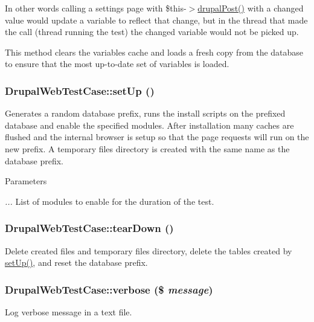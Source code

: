 In other words calling a settings page with \$this-\/$>$\hyperlink{class_drupal_web_test_case_aa773e6bf6ff8d0085dc60fb6d9ba888e}{drupalPost()} with a changed value would update a variable to reflect that change, but in the thread that made the call (thread running the test) the changed variable would not be picked up.

This method clears the variables cache and loads a fresh copy from the database to ensure that the most up-\/to-\/date set of variables is loaded. \hypertarget{class_drupal_web_test_case_a110ecf5deb57ee6a908617360c1f6ec4}{
\subsubsection[{setUp}]{\setlength{\rightskip}{0pt plus 5cm}DrupalWebTestCase::setUp ()}}
\label{class_drupal_web_test_case_a110ecf5deb57ee6a908617360c1f6ec4}
Generates a random database prefix, runs the install scripts on the prefixed database and enable the specified modules. After installation many caches are flushed and the internal browser is setup so that the page requests will run on the new prefix. A temporary files directory is created with the same name as the database prefix.


\begin{DoxyParams}{Parameters}
\item[{\em ...}]List of modules to enable for the duration of the test. \end{DoxyParams}
\hypertarget{class_drupal_web_test_case_a6c0dba3c89c4aab3fa2576857c6f2be1}{
\subsubsection[{tearDown}]{\setlength{\rightskip}{0pt plus 5cm}DrupalWebTestCase::tearDown ()}}
\label{class_drupal_web_test_case_a6c0dba3c89c4aab3fa2576857c6f2be1}
Delete created files and temporary files directory, delete the tables created by \hyperlink{class_drupal_web_test_case_a110ecf5deb57ee6a908617360c1f6ec4}{setUp()}, and reset the database prefix. \hypertarget{class_drupal_web_test_case_a46e4ad5abf681eff423f6b6de5d9f361}{
\subsubsection[{verbose}]{\setlength{\rightskip}{0pt plus 5cm}DrupalWebTestCase::verbose (\$ {\em message})}}
\label{class_drupal_web_test_case_a46e4ad5abf681eff423f6b6de5d9f361}
Log verbose message in a text file.


